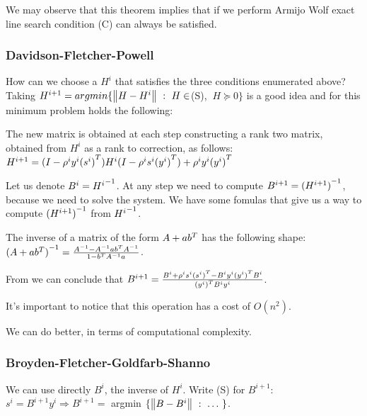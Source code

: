\documentclass[ComputationalMathematics.tex]{subfiles}
\begin{document}
\begin{obs}
  We may observe that this theorem implies that if we perform Armijo Wolf exact line search condition (C) can always be satisfied.
\end{obs}

\subsubsection{Davidson-Fletcher-Powell}
How can we choose a $H^i$ that satisfies the three conditions enumerated above? Taking $H^{i+1} =argmin \{\left\lVert H - H^i\right\rVert~:~H \in$(S), $ ~ H \succeq 0\}$ is a good idea and for this minimum problem holds the following:

\begin{theorem}
  The new matrix is obtained at each step constructing a rank two matrix, obtained from $H^i$ as a rank to correction, as follows:
  $H^{i+1} = (I - \rho^i y^i {(s^i)}^{T}) H^i(I - \rho^i s^i {(y^i)}^{T}) + \rho^i y^i {(y^i)}^{T}$
\end{theorem}

Let us denote $B^i = {H^i}^{-1}$.
At any step we need to compute $B^{i+1} = {(H^{i+1})}^{-1}$, because we need to solve the system. We have some fomulas that give us a way to compute ${(H^{i+1})}^{-1}$ from ${H^i}^{-1}$.

\begin{theorem}\label{theo:16novsmw}
  The inverse of a matrix of the form $A + a {b}^{T}$ has the following shape:
  ${(A + a {b}^{T})}^{-1} = \frac{{A}^{-1} - {A}^{-1} a {b}^{T} {A}^{-1}}{1 - {b}^{T} {A}^{-1} a}$.
\end{theorem}

\begin{obs}
  From  we can conclude that $B^{i+1} = \frac{B^i + \rho^i s^i {(s^i)}^{T} - B^i y^i {(y^i)}^{T}B^i}{{(y^i)}^{T} B^i y^i}$.
\end{obs}
It's important to notice that this operation has a cost of $O(n^2)$.

We can do better, in terms of computational complexity.

\subsubsection{Broyden-Fletcher-Goldfarb-Shanno}

We can use directly $B^i$, the inverse of $H^i$.
Write (S) for $B^{i+1}$: $s^i = B^{i+1} y^i \Longrightarrow B^{i+1} =$ argmin $\{\left\lVert B - B^i\right\rVert~:~\ldots~ \}$.
\end{document}

